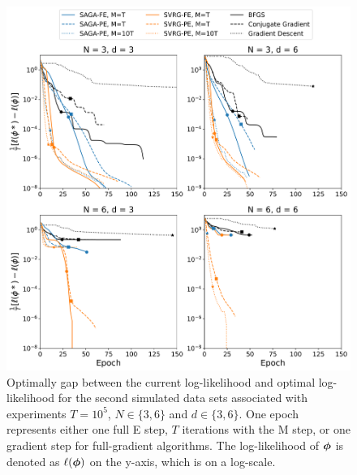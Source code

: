 \documentclass[12pt]{article}
\begin{document}
\begin{figure}[H]
    \centering
    \includegraphics[width=6.5in]{../plt/log-like_v_epoch_T-100000-001.png}
    \caption{Optimally gap between the current log-likelihood and optimal log-likelihood for the second simulated data sets associated with experiments $T=10^{5}$, $N \in \{3,6\}$ and $d \in \{3,6\}$. One epoch represents either one full E step, $T$ iterations with the M step, or one gradient step for full-gradient algorithms. The log-likelihood of $\boldsymbol{\phi}$ is denoted as $\ell(\boldsymbol{\phi})$ on the y-axis, which is on a log-scale.}
\end{figure}
%
\end{document}
